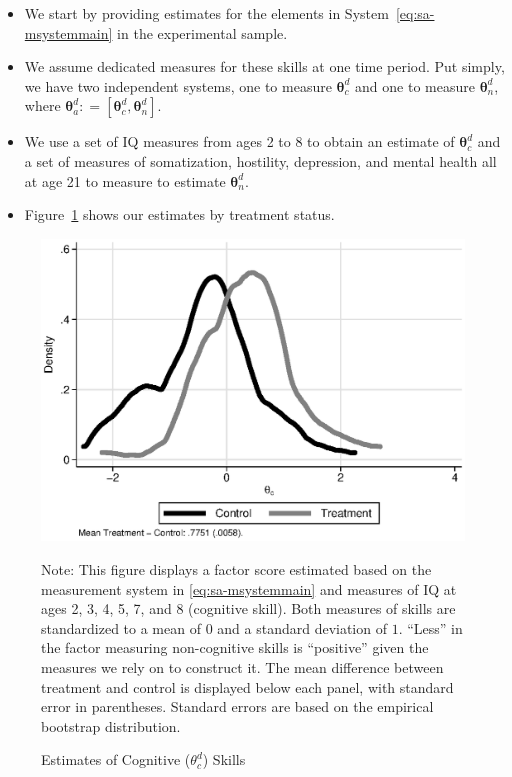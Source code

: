 \documentclass[static]{JJH-Beamer}
\begin{document}
\begin{frame}

\begin{itemize}
\item We start by providing estimates for the elements in System~\eqref{eq:sa-msystemmain} in the experimental sample.
\item We assume dedicated measures for these skills at one time period. Put simply, we have two independent systems, one to measure $\bm{\theta}_{c}^d$ and one to measure $\bm{\theta}_{n}^d$, where $\bm{\theta}_{a}^d: = \left[ \bm{\theta}_{c}^d, \bm{\theta}_{n}^d \right]$.
\item We use a set of IQ measures from ages 2 to 8 to obtain an estimate of $\bm{\theta}_{c}^d$ and a set of measures of somatization, hostility, depression, and mental health all at age 21 to measure to estimate $\bm{\theta}_{n}^d$.
\item Figure~\ref{figure:factorsm} shows our estimates by treatment status.
\end{itemize}

\end{frame}

\begin{frame}

\begin{figure}[H]
\caption{Estimates of Cognitive ($\theta_{c}^d$) Skills}\label{figure:factorsm}
\begin{center}
\includegraphics[width=.65\textwidth]{output/abccare_cfactor.eps}
\end{center}
\tiny \flushleft Note: This figure displays a factor score estimated based on the measurement system in \eqref{eq:sa-msystemmain} and measures of IQ at ages 2, 3, 4, 5, 7, and 8 (cognitive skill). Both measures of skills are standardized to a mean of $0$ and a standard deviation of $1$. ``Less'' in the factor measuring non-cognitive skills is ``positive'' given the measures we rely on to construct it. The mean difference between treatment and control is displayed below each panel, with standard error in parentheses. Standard errors are based on the empirical bootstrap distribution.\\
\end{figure}

\end{frame}
\end{document}
